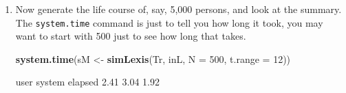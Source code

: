 \documentclass[
]{book}
\newenvironment{Shaded}{\begin{snugshade}}{\end{snugshade}}
\newcommand{\AttributeTok}[1]{\textcolor[rgb]{0.13,0.29,0.53}{#1}}
\newcommand{\DecValTok}[1]{\textcolor[rgb]{0.00,0.00,0.81}{#1}}
\newcommand{\FunctionTok}[1]{\textcolor[rgb]{0.13,0.29,0.53}{\textbf{#1}}}
\newcommand{\NormalTok}[1]{#1}
\newcommand{\OtherTok}[1]{\textcolor[rgb]{0.56,0.35,0.01}{#1}}
\newcommand{\StringTok}[1]{\textcolor[rgb]{0.31,0.60,0.02}{#1}}
\begin{document}
\begin{enumerate}
\begin{Shaded}
\begin{Highlighting}[]
\FunctionTok{summary}\NormalTok{(iL, }\AttributeTok{by =} \StringTok{"sex"}\NormalTok{)}
\end{Highlighting}
\end{Shaded}

\begin{Shaded}
\begin{Highlighting}[]
\NormalTok{$M}

\NormalTok{Transitions:}
\NormalTok{     To}
\NormalTok{From  NRA Rem ESRD ESRD(Rem) Records: Events: Risk time: Persons:}
\NormalTok{  NRA   1   1    8         0       10       9       98.3       10}
\NormalTok{  Rem   0   0    0         1        1       1       12.0        1}
\NormalTok{  Sum   1   1    8         1       11      10      110.3       10}

\NormalTok{$F}

\NormalTok{Transitions:}
\NormalTok{     To}
\NormalTok{From  NRA Rem ESRD ESRD(Rem) Records: Events: Risk time: Persons:}
\NormalTok{  NRA   0   4    6         0       10      10       55.0       10}
\NormalTok{  Rem   0   0    0         4        4       4       28.2        4}
\NormalTok{  Sum   0   4    6         4       14      14       83.2       10}
\end{Highlighting}
\end{Shaded}

  What type of object have you got as \texttt{iL}?
\item
  Now generate the life course of, say, 5,000 persons, and look at the summary.
  The \texttt{system.time} command is just to tell you how long it
  took, you may want to start with 500 just to see how long that takes.

\begin{Shaded}
\begin{Highlighting}[]
\FunctionTok{system.time}\NormalTok{(sM }\OtherTok{\textless{}{-}} \FunctionTok{simLexis}\NormalTok{(Tr, inL, }\AttributeTok{N =} \DecValTok{500}\NormalTok{, }\AttributeTok{t.range =} \DecValTok{12}\NormalTok{))}
\end{Highlighting}
\end{Shaded}

\begin{Shaded}
\begin{Highlighting}[]
\NormalTok{   user  system elapsed }
\NormalTok{   2.41    3.04    1.92 }
\end{Highlighting}
\end{Shaded}


\end{enumerate}
\end{document}
